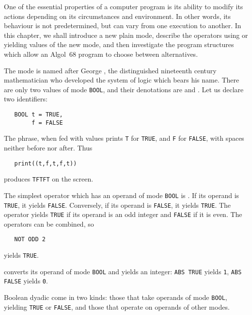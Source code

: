 %
%
%
One of the essential properties of a computer program is its ability
to modify its actions depending on its circumstances and environment.
In other words, its behaviour is not predetermined, but can vary from
one execution to another. In this chapter, we shall introduce a new
plain mode, describe the operators using or yielding values of the
new mode, and then investigate the program structures which allow an
Algol~68 program to choose between alternatives.

\pagebreak
{}
 The mode  is named after George
, the distinguished nineteenth century
mathematician who developed the system of logic which bears his name.
There are only two values of mode \verb|BOOL|, and their denotations
are  and .  Let us declare two identifiers:
\begin{verbatim}
   BOOL t = TRUE,
        f = FALSE
\end{verbatim}
\noindent
The  phrase, when fed with  values prints
\verb|T| for \verb|TRUE|, and \verb|F| for \verb|FALSE|, with spaces
neither before nor after. Thus
\begin{verbatim}
   print((t,f,t,f,t))
\end{verbatim}
\noindent
produces \verb|TFTFT| on the screen.

The simplest operator which has an operand of mode \verb|BOOL| is
. If its operand is \verb|TRUE|, it yields \verb|FALSE|.
Conversely, if its operand is \verb|FALSE|, it yields \verb|TRUE|.
The operator  yields \verb|TRUE| if its operand is an odd
integer and \verb|FALSE| if it is even. The operators can be
combined, so
\begin{verbatim}
   NOT ODD 2
\end{verbatim}
\noindent
yields \verb|TRUE|.

 converts its operand of mode \verb|BOOL| and yields an
integer: \verb|ABS TRUE| yields \verb|1|, \verb|ABS FALSE| yields
\verb|0|.

Boolean dyadic  come in two
kinds: those that take operands of mode \verb|BOOL|, yielding
\verb|TRUE| or \verb|FALSE|, and those that operate on operands of
other modes.

